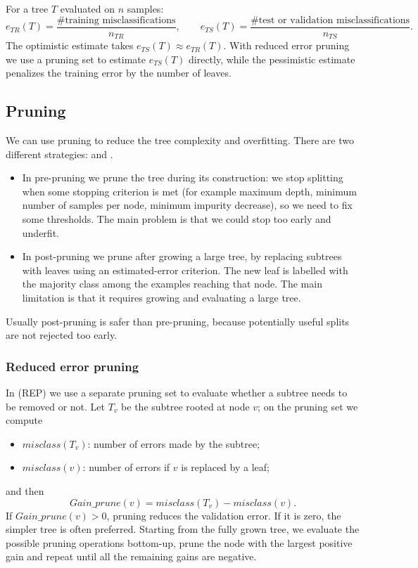 For a tree $T$ evaluated on $n$ samples:
\[
  e_{TR}(T) = \frac{\#\text{training misclassifications}}{n_{TR}},
  \qquad
  e_{TS}(T) = \frac{\#\text{test or validation misclassifications}}{n_{TS}}.
\]
The optimistic estimate takes $e_{TS}(T) \approx e_{TR}(T)$. With reduced error pruning we use a pruning set to estimate $e_{TS}(T)$ directly, while the pessimistic estimate penalizes the training error by the number of leaves.

\subsection{Pruning}

We can use pruning to reduce the tree complexity and overfitting. There are two different strategies:  and .
\begin{itemize}
  \item In pre-pruning we prune the tree during its construction: we stop splitting when some stopping criterion is met (for example maximum depth, minimum number of samples per node, minimum impurity decrease), so we need to fix some thresholds. The main problem is that we could stop too early and underfit.
  \item In post-pruning we prune after growing a large tree, by replacing subtrees with leaves using an estimated-error criterion. The new leaf is labelled with the majority class among the examples reaching that node. The main limitation is that it requires growing and evaluating a large tree.
\end{itemize}
Usually post-pruning is safer than pre-pruning, because potentially useful splits are not rejected too early.

\subsubsection{Reduced error pruning}
In  (REP) we use a separate pruning set to evaluate whether a subtree needs to be removed or not. Let $T_v$ be the subtree rooted at node $v$; on the pruning set we compute
\begin{itemize}
  \item $\mathit{misclass}(T_v)$: number of errors made by the subtree;
  \item $\mathit{misclass}(v)$: number of errors if $v$ is replaced by a leaf;
\end{itemize}
and then
\[
  \mathit{Gain\_prune}(v) = \mathit{misclass}(T_v) - \mathit{misclass}(v).
\]
If $\mathit{Gain\_prune}(v) > 0$, pruning reduces the validation error. If it is zero, the simpler tree is often preferred. Starting from the fully grown tree, we evaluate the possible pruning operations bottom-up, prune the node with the largest positive gain and repeat until all the remaining gains are negative.

